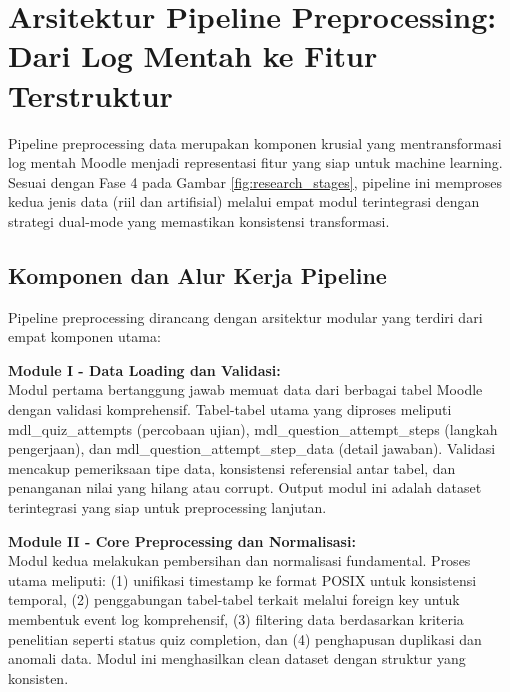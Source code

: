 \section{Arsitektur Pipeline Preprocessing: Dari Log Mentah ke Fitur Terstruktur}
\label{sec:pipelinePreprocessing}
Pipeline preprocessing data merupakan komponen krusial yang mentransformasi log mentah Moodle menjadi representasi fitur yang siap untuk machine learning. Sesuai dengan Fase 4 pada Gambar \ref{fig:research_stages}, pipeline ini memproses kedua jenis data (riil dan artifisial) melalui empat modul terintegrasi dengan strategi dual-mode yang memastikan konsistensi transformasi.

\subsection{Komponen dan Alur Kerja Pipeline}
\label{sec:komponenPipeline}

Pipeline preprocessing dirancang dengan arsitektur modular yang terdiri dari empat komponen utama:

\textbf{Module I - Data Loading dan Validasi:} \\
Modul pertama bertanggung jawab memuat data dari berbagai tabel Moodle dengan validasi komprehensif. Tabel-tabel utama yang diproses meliputi mdl\_quiz\_attempts (percobaan ujian), mdl\_question\_attempt\_steps (langkah pengerjaan), dan mdl\_question\_attempt\_step\_data (detail jawaban). Validasi mencakup pemeriksaan tipe data, konsistensi referensial antar tabel, dan penanganan nilai yang hilang atau corrupt. Output modul ini adalah dataset terintegrasi yang siap untuk preprocessing lanjutan.

\textbf{Module II - Core Preprocessing dan Normalisasi:} \\
Modul kedua melakukan pembersihan dan normalisasi fundamental. Proses utama meliputi: (1) unifikasi timestamp ke format POSIX untuk konsistensi temporal, (2) penggabungan tabel-tabel terkait melalui foreign key untuk membentuk event log komprehensif, (3) filtering data berdasarkan kriteria penelitian seperti status quiz completion, dan (4) penghapusan duplikasi dan anomali data. Modul ini menghasilkan clean dataset dengan struktur yang konsisten.

